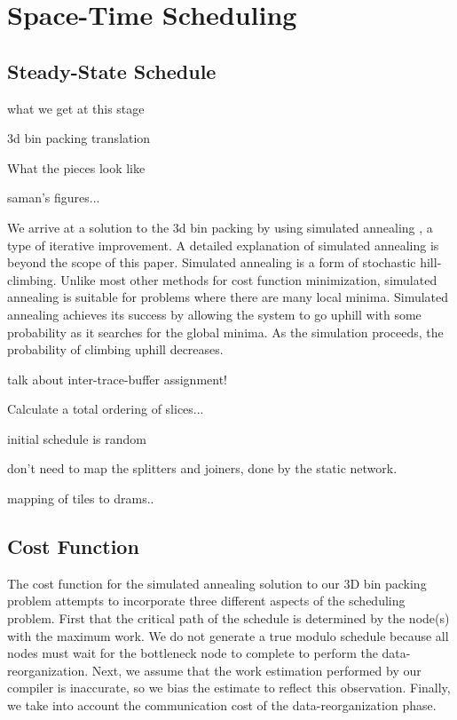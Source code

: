 \section{Space-Time Scheduling}
\label{sec:scheduling}
\subsection{Steady-State Schedule}


what we get at this stage

3d bin packing translation

What the pieces look like 

saman's figures...

We arrive at a solution to the 3d bin packing by using simulated
annealing \cite{simanneal}, a type of iterative improvement.  A
detailed explanation of simulated annealing is beyond the scope of
this paper.  Simulated annealing is a form of stochastic
hill-climbing. Unlike most other methods for cost function
minimization, simulated annealing is suitable for problems where there
are many local minima.  Simulated annealing achieves its success by
allowing the system to go uphill with some probability as it searches
for the global minima.  As the simulation proceeds, the probability of
climbing uphill decreases.

talk about inter-trace-buffer assignment!

Calculate a total ordering of slices...

initial schedule is random

don't need to map the splitters and joiners, done by the static network.

mapping of tiles to drams..

\subsection{Cost Function}
The cost function for the simulated annealing solution to our 3D bin
packing problem attempts to incorporate three different aspects of the
scheduling problem.  First that the critical path of the schedule is
determined by the node(s) with the maximum work.  We do not generate a
true modulo schedule because all nodes must wait for the bottleneck
node to complete to perform the data-reorganization.  Next, we assume
that the work estimation performed by our compiler is inaccurate, so
we bias the estimate to reflect this observation.  Finally, we take
into account the communication cost of the data-reorganization phase.

